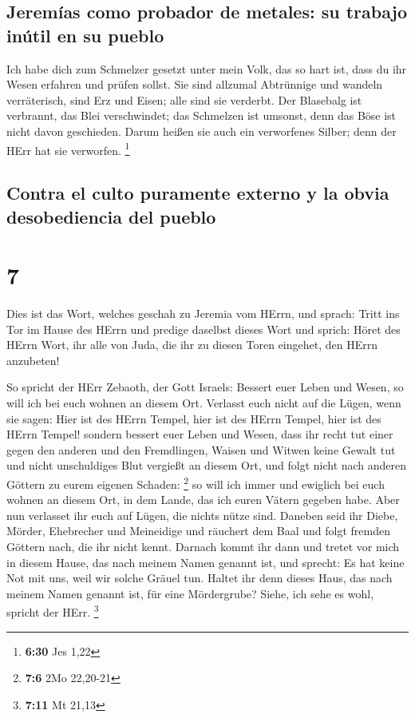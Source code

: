 \hypertarget{jeremuxedas-como-probador-de-metales-su-trabajo-inuxfatil-en-su-pueblo}{%
\subsection{Jeremías como probador de metales: su trabajo inútil en su
pueblo}\label{jeremuxedas-como-probador-de-metales-su-trabajo-inuxfatil-en-su-pueblo}}

 Ich habe dich zum Schmelzer gesetzt unter mein Volk, das
so hart ist, dass du ihr Wesen erfahren und prüfen sollst.
 Sie sind allzumal Abtrünnige und wandeln verräterisch,
sind Erz und Eisen; alle sind sie verderbt.  Der
Blasebalg ist verbrannt, das Blei verschwindet; das Schmelzen ist
umsonst, denn das Böse ist nicht davon geschieden.  Darum
heißen sie auch ein verworfenes Silber; denn der HErr hat sie verworfen.
\footnote{\textbf{6:30} Jes 1,22}

\hypertarget{contra-el-culto-puramente-externo-y-la-obvia-desobediencia-del-pueblo}{%
\subsection{Contra el culto puramente externo y la obvia desobediencia
del
pueblo}\label{contra-el-culto-puramente-externo-y-la-obvia-desobediencia-del-pueblo}}

\hypertarget{section-6}{%
\section{7}\label{section-6}}

 Dies ist das Wort, welches geschah zu Jeremia vom HErrn,
und sprach:  Tritt ins Tor im Hause des HErrn und predige
daselbst dieses Wort und sprich: Höret des HErrn Wort, ihr alle von
Juda, die ihr zu diesen Toren eingehet, den HErrn anzubeten!

 So spricht der HErr Zebaoth, der Gott Israels: Bessert
euer Leben und Wesen, so will ich bei euch wohnen an diesem Ort.
 Verlasst euch nicht auf die Lügen, wenn sie sagen: Hier
ist des HErrn Tempel, hier ist des HErrn Tempel, hier ist des HErrn
Tempel!  sondern bessert euer Leben und Wesen, dass ihr
recht tut einer gegen den anderen  und den Fremdlingen,
Waisen und Witwen keine Gewalt tut und nicht unschuldiges Blut vergießt
an diesem Ort, und folgt nicht nach anderen Göttern zu eurem eigenen
Schaden: \footnote{\textbf{7:6} 2Mo 22,20-21}  so will ich
immer und ewiglich bei euch wohnen an diesem Ort, in dem Lande, das ich
euren Vätern gegeben habe.  Aber nun verlasset ihr euch
auf Lügen, die nichts nütze sind.  Daneben seid ihr Diebe,
Mörder, Ehebrecher und Meineidige und räuchert dem Baal und folgt
fremden Göttern nach, die ihr nicht kennt.  Darnach kommt
ihr dann und tretet vor mich in diesem Hause, das nach meinem Namen
genannt ist, und sprecht: Es hat keine Not mit uns, weil wir solche
Gräuel tun.  Haltet ihr denn dieses Haus, das nach meinem
Namen genannt ist, für eine Mördergrube? Siehe, ich sehe es wohl,
spricht der HErr. \footnote{\textbf{7:11} Mt 21,13}

